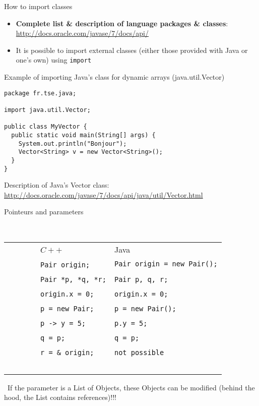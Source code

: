 \documentclass[English,c,%
hyperref={%
    pdftitle={FISA-DE2 OOP in Java},%
    pdfauthor={Muller, Gravier, Laforest, Subercaze},%
    pdfsubject={OOP in Java},%
    pdfkeywords={OOP, Java}%
    },%
xcolor={pdftex,svgnames} %
]{beamer}
\begin{document}
\begin{frame}{How to import classes}
\begin{itemize}
  \item \textbf{Complete list \& description of language packages \& classes}:\\
  \url{http://docs.oracle.com/javase/7/docs/api/}
  \vspace{2em}
  \item It is possible to import external classes (either those provided with Java or one's own) using \texttt{import}
\end{itemize}
\end{frame}


\begin{frame}[fragile]{Example of importing Java's class for dynamic arrays (java.util.Vector)}
\begin{lstlisting}[escapechar=\%,label=myvectorpackage,caption=MyVector.java.]
package fr.tse.java;

import java.util.Vector;

public class MyVector {
  public static void main(String[] args) {
    System.out.println("Bonjour");
    Vector<String> v = new Vector<String>();
  }
}
\end{lstlisting}
Description of Java's Vector class:\\
\url{http://docs.oracle.com/javase/7/docs/api/java/util/Vector.html}
\end{frame}

\begin{frame}[fragile]{Pointeurs and parameters}

\begin{table}
    \begin{tabular}{|l|l|}
        $C++$           & Java           \\
        \texttt{Pair origin;}     & \texttt{Pair origin = new Pair();} \\
        \texttt{Pair *p, *q, *r;} & \texttt{Pair p, q, r;}            \\
        \texttt{origin.x = 0;}    & \texttt{origin.x = 0;}            \\
        \texttt{p = new Pair;}    & \texttt{p = new Pair();}           \\
        \texttt{p -> y = 5;}      & \texttt{p.y = 5;}                  \\
        \texttt{q = p;}           & \texttt{q = p;}                    \\
        \texttt{r =  \& origin;}  & \texttt{not possible}              \\
    \end{tabular}
\end{table}

\danger{}~If the parameter is a List of Objects, these Objects can be
modified (behind the hood, the List contains references)!!!

\end{frame}
\end{document}
